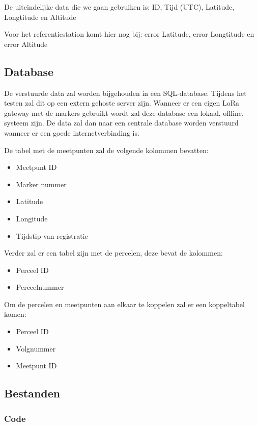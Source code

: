 De uiteindelijke data die we gaan gebruiken is:
ID, Tijd (UTC), Latitude, Longtitude en Altitude

Voor het referentiestation komt hier nog bij:
error Latitude, error Longtitude en error Altitude

\subsection{Database}
\label{sec:database}

De verstuurde data zal worden bijgehouden in een SQL-database. Tijdens het testen
zal dit op een extern gehoste server zijn.
Wanneer er een eigen LoRa gateway met de markers gebruikt wordt zal deze database
een lokaal, offline, systeem zijn. De data zal dan naar een centrale database
worden verstuurd wanneer er een goede internetverbinding is.

De tabel met de meetpunten zal de volgende kolommen bevatten:
\begin{itemize}
    \item Meetpunt ID
    \item Marker nummer
    \item Latitude
    \item Longitude
    \item Tijdstip van registratie
\end{itemize}

Verder zal er een tabel zijn met de percelen, deze bevat de kolommen:
\begin{itemize}
    \item Perceel ID
    \item Perceelnummer
\end{itemize}

Om de percelen en meetpunten aan elkaar te koppelen zal er een koppeltabel komen:
\begin{itemize}
    \item Perceel ID
    \item Volgnummer
    \item Meetpunt ID
\end{itemize}

\subsection{Bestanden}
\subsubsection{Code}
